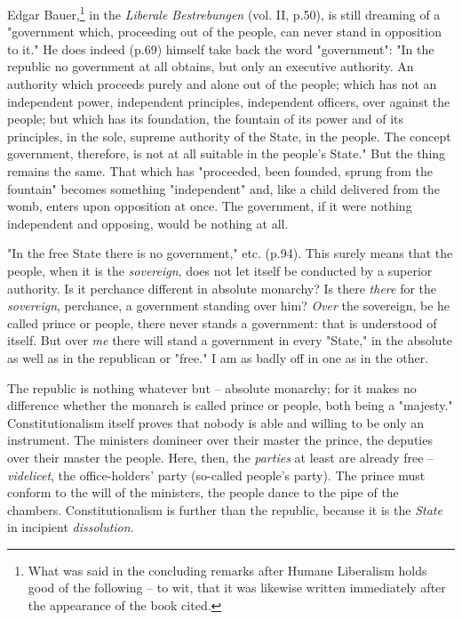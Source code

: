 Edgar Bauer,\footnote{What was said in the concluding remarks after Humane 
Liberalism holds good of the following -- to wit, that it was likewise written 
immediately after the appearance of the book cited.} in the \textit{Liberale 
Bestrebungen} (vol. II, p.50), is still dreaming of a "{}government which, 
proceeding out of the people, can never stand in opposition to it."{} He does 
indeed (p.69) himself take back the word "{}government"{}: "{}In the republic 
no government at all obtains, but only an executive authority. An authority 
which proceeds purely and alone out of the people; which has not an 
independent power, independent principles, independent officers, over against 
the people; but which has its foundation, the fountain of its power and of its 
principles, in the sole, supreme authority of the State, in the people. The 
concept government, therefore, is not at all suitable in the people's 
State."{} But the thing remains the same. That which has "{}proceeded, been 
founded, sprung from the fountain"{} becomes something "{}independent"{} and, 
like a child delivered from the womb, enters upon opposition at once. The 
government, if it were nothing independent and opposing, would be nothing at 
all.

"{}In the free State there is no government,"{} etc. (p.94). This surely means 
that the people, when it is the \textit{sovereign}, does not let itself be 
conducted by a superior authority. Is it perchance different in absolute 
monarchy? Is there \textit{there} for the \textit{sovereign}, perchance, a 
government standing over him? \textit{Over} the sovereign, be he called prince 
or people, there never stands a government: that is understood of itself. But 
over \textit{me} there will stand a government in every "{}State,"{} in the 
absolute as well as in the republican or "{}free."{} I am as badly off in one 
as in the other.

The republic is nothing whatever but -- absolute monarchy; for it makes no 
difference whether the monarch is called prince or people, both being a 
"{}majesty."{} Constitutionalism itself proves that nobody is able and willing 
to be only an instrument. The ministers domineer over their master the prince, 
the deputies over their master the people. Here, then, the \textit{parties} at 
least are already free -- \textit{videlicet}, the office-holders' party 
(so-called people's party). The prince must conform to the will of the 
ministers, the people dance to the pipe of the chambers. Constitutionalism is 
further than the republic, because it is the \textit{State} in incipient 
\textit{dissolution}.

